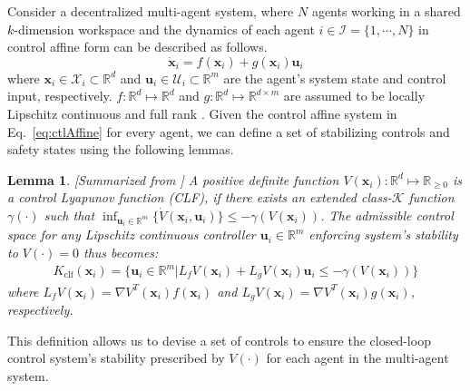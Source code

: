 \documentclass[letterpaper, 10 pt, conference]{ieeeconf}
\theoremstyle{plain}
\newtheorem{lemma}[theorem]{Lemma}
\begin{document}
Consider a decentralized multi-agent system, where $N$ agents working in a shared 
$k$-dimension
workspace and the dynamics of each agent $i \in \mathcal{I} = \{1, \cdots, N\}$ in control affine form can be described as follows.
\begin{equation} \label{eq:ctlAffine}
    \dot{\mathbf{x}}_i = f(\mathbf{x}_i) + g(\mathbf{x}_i) \mathbf{u}_i
\end{equation}
where $\mathbf{x}_i \in \mathcal{X}_i \subset \mathbb{R}^d$ and $\mathbf{u}_i \in \mathcal{U}_i \subset \mathbb{R}^m$ are the agent's system state and control input, respectively. 
$f: \mathbb{R}^d \mapsto \mathbb{R}^d$ and 
$g: \mathbb{R}^d \mapsto \mathbb{R}^{d \times m}$ are assumed to be locally Lipschitz continuous and full rank \cite{reis2020control}.
Given the control affine system in Eq.~\eqref{eq:ctlAffine} for every agent, we can define a set of stabilizing controls and safety states using the following lemmas.


\begin{lemma}\label{lem:clf}
\label{eq:clf}[Summarized from \cite{ames2019control}] A positive definite function $V(\mathbf{x}_i): \mathbb{R}^d \mapsto \mathbb{R}_{\geq 0}$ is a control Lyapunov function (CLF),
if there exists an extended class-$\mathcal{K}$ function $\gamma(\cdot)$ such that  $\inf_{\mathbf{u}_i \in \mathbb{R}^m}\{\dot{V}(\mathbf{x}_i, \mathbf{u}_i)\}\leq -\gamma(V(\mathbf{x}_i))$. The admissible control space for any Lipschitz continuous controller $\mathbf{u}_i \in \mathbb{R}^m$ enforcing system's stability to $V(\cdot)=0$ thus becomes:
{\small \begin{align}\label{eq:clf_lemma}
    K_\mathrm{clf}(\mathbf{x}_i) = \{ \mathbf{u}_i \in \mathbb{R}^m | L_f V(\mathbf{x}_i) + L_gV(\mathbf{x}_i)\mathbf{u}_i \leq -\gamma(V(\mathbf{x}_i))\}
\end{align}}
where $L_f V(\mathbf{x}_i) = \nabla V^{T}(\mathbf{x}_i) f(\mathbf{x}_i)$ and $L_g V(\mathbf{x}_i) = \nabla V ^{T}(\mathbf{x}_i) g(\mathbf{x}_i)$, respectively.
\end{lemma}
This definition allows us to devise a set of controls to ensure the closed-loop control system's stability prescribed by $V(\cdot)$ for each agent in the multi-agent system.
\end{document}
